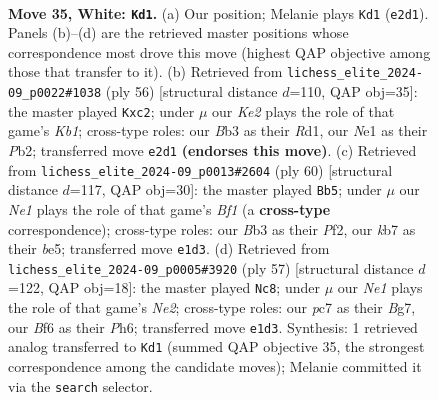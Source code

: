 \documentclass[11pt]{article}
\begin{document}
\clearpage

\begin{figure}[p]\centering
\begin{subfigure}{0.46\textwidth}\centering
\resizebox{\linewidth}{!}{%
\newchessgame
\chessboard[
  setfen={r3r3/1kp5/pP1n1B2/1b1N1p2/4p2R/1B6/1P2KPP1/R3N3 w - - 1 35},
  showmover=false,
  pgfstyle=straightmove, color=movearrow, markmove={e2-d1}
]}
\caption{}
\end{subfigure}\hfill
\begin{subfigure}{0.46\textwidth}\centering
\resizebox{\linewidth}{!}{%
\newchessgame
\chessboard[
  setfen={6r1/4kp1R/p1p1b1r1/P3n1P1/3NP3/5B2/1Pp3P1/1K1R4 w - - 0 29},
  showmover=false,
  pgfstyle=straightmove, color=movearrow, markmove={b1-c2}
]}
\caption{}
\end{subfigure}
\\[4pt]
\begin{subfigure}{0.46\textwidth}\centering
\resizebox{\linewidth}{!}{%
\newchessgame
\chessboard[
  setfen={r2rb3/5k1p/P1n1pppB/2Rpb3/1p3NP1/1P6/5P1P/3R1BK1 w - - 6 31},
  showmover=false,
  pgfstyle=straightmove, color=movearrow, markmove={f1-b5}
]}
\caption{}
\end{subfigure}\hfill
\begin{subfigure}{0.46\textwidth}\centering
\resizebox{\linewidth}{!}{%
\newchessgame
\chessboard[
  setfen={r7/4nkb1/P1b2p1p/Rn2p1p1/1BN1P3/2P3P1/5PBP/R5K1 b - - 0 29},
  showmover=false,
  pgfstyle=straightmove, color=movearrow, markmove={e7-c8}
]}
\caption{}
\end{subfigure}
\caption{\textbf{Move 35, White: \texttt{Kd1}.} (a) Our position; Melanie plays \texttt{Kd1} (\texttt{e2d1}). Panels (b)--(d) are the retrieved master positions whose correspondence most drove this move (highest QAP objective among those that transfer to it). (b) Retrieved from \texttt{lichess\_elite\_2024-09\_p0022\#1038} (ply 56) [structural distance $d$=110, QAP obj=35]: the master played \texttt{Kxc2}; under $\mu$ our \emph{Ke2} plays the role of that game's \emph{Kb1}; cross-type roles: our \emph{B}b3 as their \emph{R}d1, our \emph{N}e1 as their \emph{P}b2; transferred move \texttt{e2d1} \textbf{(endorses this move)}. (c) Retrieved from \texttt{lichess\_elite\_2024-09\_p0013\#2604} (ply 60) [structural distance $d$=117, QAP obj=30]: the master played \texttt{Bb5}; under $\mu$ our \emph{Ne1} plays the role of that game's \emph{Bf1} (a \textbf{cross-type} correspondence); cross-type roles: our \emph{B}b3 as their \emph{P}f2, our \emph{k}b7 as their \emph{b}e5; transferred move \texttt{e1d3}. (d) Retrieved from \texttt{lichess\_elite\_2024-09\_p0005\#3920} (ply 57) [structural distance $d$=122, QAP obj=18]: the master played \texttt{Nc8}; under $\mu$ our \emph{Ne1} plays the role of that game's \emph{Ne2}; cross-type roles: our \emph{p}c7 as their \emph{B}g7, our \emph{B}f6 as their \emph{P}h6; transferred move \texttt{e1d3}. Synthesis: 1 retrieved analog transferred to \texttt{Kd1} (summed QAP objective 35, the strongest correspondence among the candidate moves); Melanie committed it via the \texttt{search} selector.}
\label{fig:thought-m68}
\end{figure}
\end{document}
